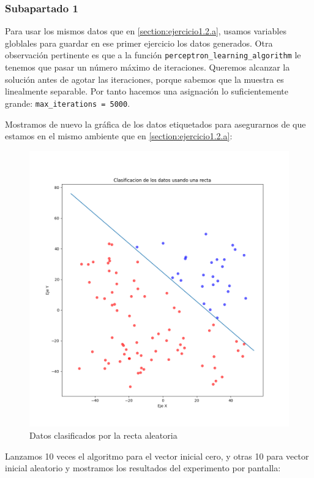 \documentclass[11pt]{article}
\begin{document}
\subsubsection{Subapartado 1}

Para usar los mismos datos que en \ref{section:ejercicio1.2.a}, usamos variables globlales para guardar en ese primer ejercicio los datos generados. Otra observación pertinente es que a la función \lstinline{perceptron_learning_algorithm} le tenemos que pasar un número máximo de iteraciones. Queremos alcanzar la solución antes de agotar las iteraciones, porque sabemos que la muestra es linealmente separable. Por tanto hacemos una asignación lo suficientemente grande: \lstinline{max_iterations = 5000}.

Mostramos de nuevo la gráfica de los datos etiquetados para asegurarnos de que estamos en el mismo ambiente que en \ref{section:ejercicio1.2.a}:

\begin{figure}[H]
    \centering
    \includegraphics[scale=0.3]{puntos_clasificados_recta02}
    \caption{Datos clasificados por la recta aleatoria}
\end{figure}

Lanzamos 10 veces el algoritmo para el vector inicial cero, y otras 10 para vector inicial aleatorio y mostramos los resultados del experimento por pantalla:
\end{document}
